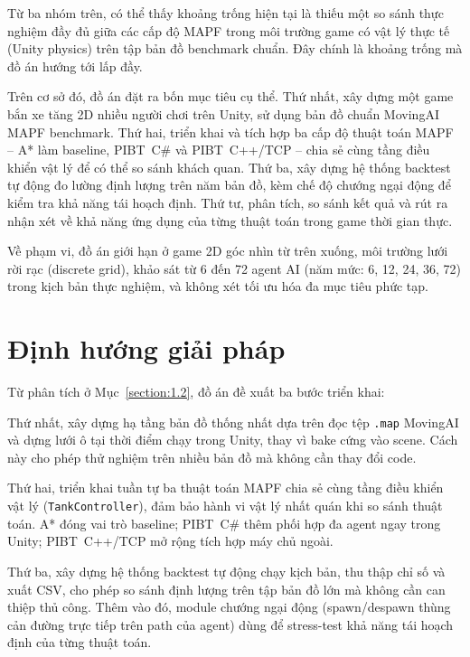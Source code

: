 \documentclass[../DoAn.tex]{subfiles}
\begin{document}
Từ ba nhóm trên, có thể thấy khoảng trống hiện tại là thiếu một so sánh thực nghiệm đầy
đủ giữa các cấp độ MAPF trong môi trường game có vật lý thực tế (Unity physics) trên tập
bản đồ benchmark chuẩn. Đây chính là khoảng trống mà đồ án hướng tới lấp đầy.

Trên cơ sở đó, đồ án đặt ra bốn mục tiêu cụ thể. Thứ nhất, xây dựng một game bắn xe tăng 2D
nhiều người chơi trên Unity, sử dụng bản đồ chuẩn MovingAI MAPF benchmark. Thứ hai, triển khai
và tích hợp ba cấp độ thuật toán MAPF -- A* làm baseline, PIBT~C\# và PIBT~C++/TCP -- chia sẻ
cùng tầng điều khiển vật lý để có thể so sánh khách quan. Thứ ba, xây dựng hệ thống backtest
tự động đo lường định lượng trên năm bản đồ, kèm chế độ chướng ngại động để kiểm tra khả năng
tái hoạch định. Thứ tư, phân tích, so sánh kết quả và rút ra nhận xét về khả năng ứng dụng của
từng thuật toán trong game thời gian thực.

Về phạm vi, đồ án giới hạn ở game 2D góc nhìn từ trên xuống, môi trường lưới rời rạc
(discrete grid), khảo sát từ 6 đến 72 agent AI (năm mức: 6, 12, 24, 36, 72) trong kịch bản
thực nghiệm, và không xét tối ưu hóa đa mục tiêu phức tạp.

\section{Định hướng giải pháp}
\label{section:1.3}

Từ phân tích ở Mục~\ref{section:1.2}, đồ án đề xuất ba bước triển khai:

Thứ nhất, xây dựng hạ tầng bản đồ thống nhất dựa trên đọc tệp \texttt{.map} MovingAI
và dựng lưới ô tại thời điểm chạy trong Unity, thay vì bake cứng vào scene. Cách này
cho phép thử nghiệm trên nhiều bản đồ mà không cần thay đổi code.

Thứ hai, triển khai tuần tự ba thuật toán MAPF chia sẻ cùng tầng điều khiển vật lý
(\texttt{TankController}), đảm bảo hành vi vật lý nhất quán khi so sánh thuật toán.
A* đóng vai trò baseline; PIBT~C\# thêm phối hợp đa agent ngay trong Unity; PIBT~C++/TCP
mở rộng tích hợp máy chủ ngoài.

Thứ ba, xây dựng hệ thống backtest tự động chạy kịch bản, thu thập chỉ số và xuất CSV,
cho phép so sánh định lượng trên tập bản đồ lớn mà không cần can thiệp thủ công. Thêm
vào đó, module chướng ngại động (spawn/despawn thùng cản đường trực tiếp trên path
của agent) dùng để stress-test khả năng tái hoạch định của từng thuật toán.
\end{document}
